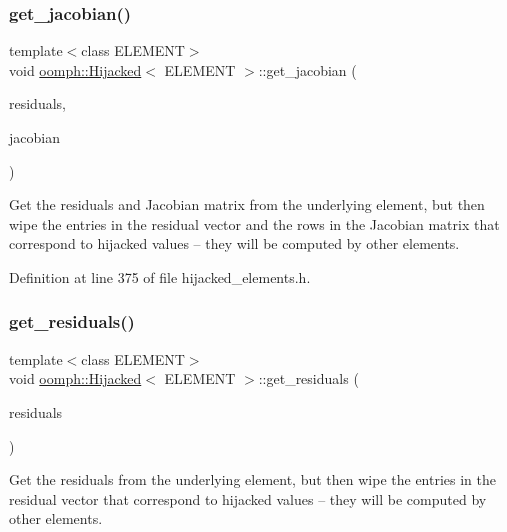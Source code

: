 \subsubsection{\texorpdfstring{get\+\_\+jacobian()}{get\_jacobian()}}
{\footnotesize\ttfamily template$<$class E\+L\+E\+M\+E\+NT$>$ \\
void \hyperlink{classoomph_1_1Hijacked}{oomph\+::\+Hijacked}$<$ E\+L\+E\+M\+E\+NT $>$\+::get\+\_\+jacobian (\begin{DoxyParamCaption}\item[{\hyperlink{classoomph_1_1Vector}{Vector}$<$ double $>$ \&}]{residuals,  }\item[{\hyperlink{classoomph_1_1DenseMatrix}{Dense\+Matrix}$<$ double $>$ \&}]{jacobian }\end{DoxyParamCaption})\hspace{0.3cm}{\ttfamily [inline]}}



Get the residuals and Jacobian matrix from the underlying element, but then wipe the entries in the residual vector and the rows in the Jacobian matrix that correspond to hijacked values -- they will be computed by other elements. 



Definition at line 375 of file hijacked\+\_\+elements.\+h.

\mbox{\label{classoomph_1_1Hijacked_adb1760705326df86f6289cc3774d37b9}} 
\subsubsection{\texorpdfstring{get\+\_\+residuals()}{get\_residuals()}}
{\footnotesize\ttfamily template$<$class E\+L\+E\+M\+E\+NT$>$ \\
void \hyperlink{classoomph_1_1Hijacked}{oomph\+::\+Hijacked}$<$ E\+L\+E\+M\+E\+NT $>$\+::get\+\_\+residuals (\begin{DoxyParamCaption}\item[{\hyperlink{classoomph_1_1Vector}{Vector}$<$ double $>$ \&}]{residuals }\end{DoxyParamCaption})\hspace{0.3cm}{\ttfamily [inline]}}



Get the residuals from the underlying element, but then wipe the entries in the residual vector that correspond to hijacked values -- they will be computed by other elements. 



